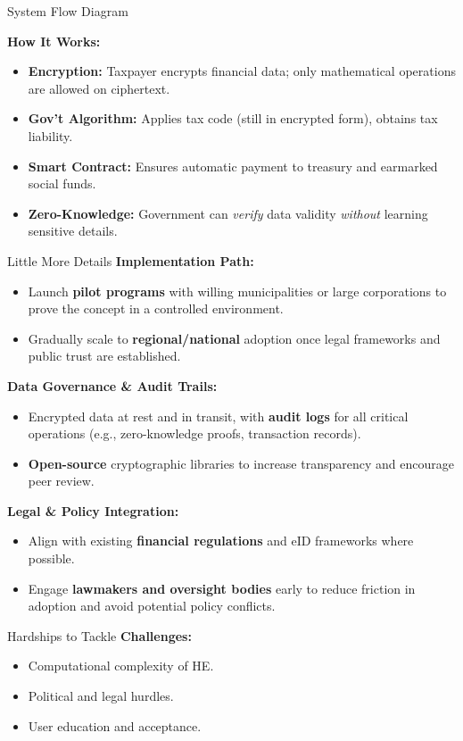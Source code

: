 \documentclass{beamer}
\begin{document}
\begin{frame}{System Flow Diagram}
\begin{center}
{\begin{tikzpicture}[>=stealth, node distance=2.2cm, 
                    every node/.style={align=center, font=\small}]
\end{tikzpicture}
}
\end{center}

\textbf{How It Works:}
\begin{itemize}
  \item \textbf{Encryption:} Taxpayer encrypts financial data; only mathematical operations are allowed on ciphertext.
  \item \textbf{Gov’t Algorithm:} Applies tax code (still in encrypted form), obtains tax liability.
  \item \textbf{Smart Contract:} Ensures automatic payment to treasury and earmarked social funds.
  \item \textbf{Zero-Knowledge:} Government can \emph{verify} data validity \textit{without} learning sensitive details.
\end{itemize}

\end{frame}

\begin{frame}{Little More Details}
    \small
    \textbf{Implementation Path:}
    \begin{itemize}
        \item Launch \textbf{pilot programs} with willing municipalities or large corporations 
              to prove the concept in a controlled environment.
        \item Gradually scale to \textbf{regional/national} adoption once legal frameworks and 
              public trust are established.
    \end{itemize}

    \textbf{Data Governance \& Audit Trails:}
    \begin{itemize}
        \item Encrypted data at rest and in transit, with \textbf{audit logs} for all 
              critical operations (e.g., zero-knowledge proofs, transaction records).
        \item \textbf{Open-source} cryptographic libraries to increase transparency and 
              encourage peer review.
    \end{itemize}

    \textbf{Legal \& Policy Integration:}
    \begin{itemize}
        \item Align with existing \textbf{financial regulations} and eID frameworks where possible.
        \item Engage \textbf{lawmakers and oversight bodies} early to reduce friction in 
              adoption and avoid potential policy conflicts.
    \end{itemize}
\end{frame}


\begin{frame}{Hardships to Tackle}
    \small
    \textbf{Challenges:}
    \begin{itemize}
      \item Computational complexity of HE.
      \item Political and legal hurdles.
      \item User education and acceptance.
    \end{itemize}
\end{frame}
\end{document}
